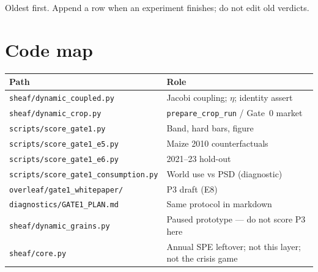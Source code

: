 \documentclass[11pt,a4paper]{article}
\begin{document}
Oldest first. Append a row when an experiment finishes; do not edit old verdicts.

\begin{center}
\small

\end{center}




\section{Code map}
\label{sec:code}

\begin{center}
\begin{tabular}{ll}
\toprule
Path & Role \\
\midrule
\texttt{sheaf/dynamic\_coupled.py} & Jacobi coupling; \(\eta\); identity assert \\
\texttt{sheaf/dynamic\_crop.py} & \texttt{prepare\_crop\_run} / Gate~0 market \\
\texttt{scripts/score\_gate1.py} & Band, hard bars, figure \\
\texttt{scripts/score\_gate1\_e5.py} & Maize 2010 counterfactuals \\
\texttt{scripts/score\_gate1\_e6.py} & 2021--23 hold-out \\
\texttt{scripts/score\_gate1\_consumption.py} & World use vs PSD (diagnostic) \\
\texttt{overleaf/gate1\_whitepaper/} & P3 draft (E8) \\
\texttt{diagnostics/GATE1\_PLAN.md} & Same protocol in markdown \\
\texttt{sheaf/dynamic\_grains.py} & Paused prototype --- do not score P3 here \\
\texttt{sheaf/core.py} & Annual SPE leftover; not this layer; not the crisis game \\
\bottomrule
\end{tabular}
\end{center}


\end{document}
